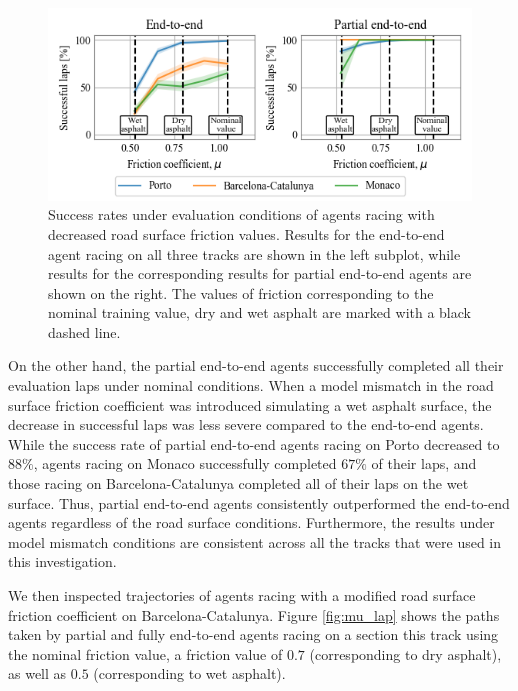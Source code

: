 \begin{figure}[htb!]
    \centering
    \includegraphics[width=\textwidth]{contents/chapt7/figs/mu/mu.png}
    \caption[Success rate of agents under evaluation conditions with mismatched road surface friction coefficient]{Success rates under evaluation conditions of agents racing with decreased road surface friction values. Results for the end-to-end agent racing on all three tracks are shown in the left subplot, while results for the corresponding results for partial end-to-end agents are shown on the right. The values of friction corresponding to the nominal training value, dry and wet asphalt are marked with a black dashed line.}
    \label{fig:mu}
\end{figure}

On the other hand, the partial end-to-end agents successfully completed all their evaluation laps under nominal conditions. 
When a model mismatch in the road surface friction coefficient was introduced simulating a wet asphalt surface, the decrease in successful laps was less severe compared to the end-to-end agents. 
While the success rate of partial end-to-end agents racing on Porto decreased to $88\%$, agents racing on Monaco successfully completed $67\%$ of their laps, and those racing on Barcelona-Catalunya completed all of their laps on the wet surface.
Thus, partial end-to-end agents consistently outperformed the end-to-end agents regardless of the road surface conditions.
Furthermore, the results under model mismatch conditions are consistent across all the tracks that were used in this investigation.

We then inspected trajectories of agents racing with a modified road surface friction coefficient on Barcelona-Catalunya.
Figure \ref{fig:mu_lap} shows the paths taken by partial and fully end-to-end agents racing on a section this track using the nominal friction value, a friction value of $0.7$ (corresponding to dry asphalt), as well as $0.5$ (corresponding to wet asphalt).

